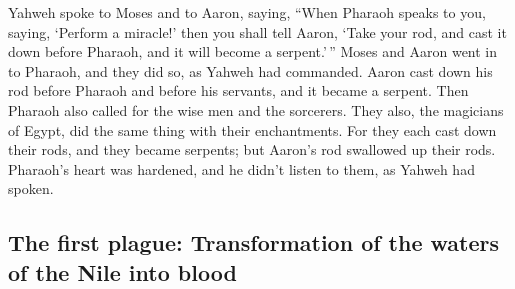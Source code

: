 \begin{paracol}{2}
\begin{otherlanguage}{english}
 Yahweh spoke to Moses and to Aaron, saying,
 ``When Pharaoh speaks to you, saying, `Perform a
miracle!' then you shall tell Aaron, `Take your rod, and cast it down
before Pharaoh, and it will become a serpent.'\,''  Moses
and Aaron went in to Pharaoh, and they did so, as Yahweh had commanded.
Aaron cast down his rod before Pharaoh and before his servants, and it
became a serpent.  Then Pharaoh also called for the wise
men and the sorcerers. They also, the magicians of Egypt, did the same
thing with their enchantments.  For they each cast down
their rods, and they became serpents; but Aaron's rod swallowed up their
rods.  Pharaoh's heart was hardened, and he didn't listen
to them, as Yahweh had spoken.

\hypertarget{the-first-plague-transformation-of-the-waters-of-the-nile-into-blood}{%
\subsection{The first plague: Transformation of the waters of the Nile
into
blood}\label{the-first-plague-transformation-of-the-waters-of-the-nile-into-blood}}


\end{otherlanguage}
\end{paracol}
